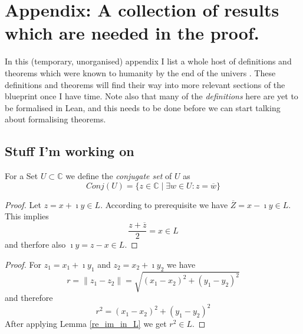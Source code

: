 \chapter{Appendix: A collection of results which are needed in the proof.}
\label{ch_bestiary}
In this (temporary, unorganised) appendix I list a whole host of definitions and theorems which were known to humanity by the end of the univers \cite{JAN_SCHRÖER:2023}. These definitions and theorems will find their way into more relevant sections of the blueprint once I have time. Note also that many of the \emph{definitions} here are yet to be formalised in Lean, and this needs to be done before we can start talking about formalising theorems.


\section*{Stuff I'm working on}



\begin{definition}
    For a Set $U \subset \mathbb{C}$ we define the \emph{conjugate set} of $U$ as 
    \begin{equation*}
        Conj(U) = \{z\in \mathbb{C} \mid \exists w\in U: z = \overline{w}\}
    \end{equation*}
\end{definition}

\begin{proof}
    Let $z = x + \imath y \in L$. According to prerequisite we have $\overline{Z}=x-\imath y \in L$. This implies
    \begin{equation*}
        \frac{z + \overline{z}}{2} = x \in L
    \end{equation*}
    and therfore also $\imath y = z - x \in L$.
\end{proof}

\begin{proof}
    For $z_1 = x_1 + \imath y_1$ and $z_2 = x_2 + \imath y_2$ we have
    \begin{equation*}
        r = \|z_1 - z_2\| = \sqrt{(x_1 - x_2)^2 + (y_1 - y_2)^2}
    \end{equation*}
    and therefore
    \begin{equation*}
        r^2 = (x_1 - x_2)^2 + (y_1 - y_2)^2 
    \end{equation*}
    After applying Lemma \ref{re_im_in_L} we get $r^2 \in L$.
\end{proof}

